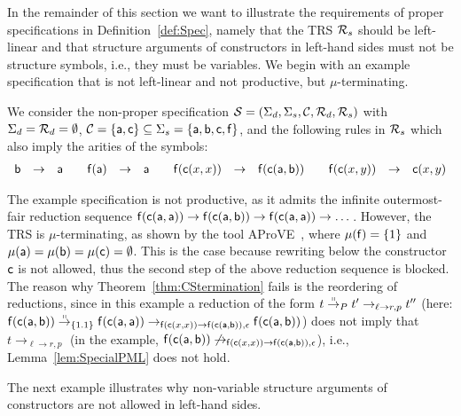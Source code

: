 \documentclass{eptcs}
\begin{document}
In the remainder of this section we want to illustrate the requirements
of proper specifications in Definition~\ref{def:Spec}, namely that the TRS
$\mathcal{R}_s$ should be left-linear and that structure arguments of constructors in
left-hand sides must not be structure symbols, i.e., they must be variables.
We begin with an example specification that is not left-linear and not
productive, but $\mu$-terminating.

\begin{example}
\label{ex:CexpLeftLin}
We consider the non-proper specification
$\mathcal{S} = (\Sigma_d,\Sigma_s,\mathcal{C},\mathcal{R}_d,\mathcal{R}_s)$ with $\Sigma_d = \mathcal{R}_d = \emptyset$,
$\mathcal{C} = \{ \mathsf{a}, \mathsf{c} \} \subseteq \Sigma_s =
\{ \mathsf{a}, \mathsf{b}, \mathsf{c}, \mathsf{f} \}$,
and the following rules in $\mathcal{R}_s$ which also imply the arities of the symbols:
\[
\begin{array}{rcl@{\qquad}rcl@{\qquad}rcl@{\qquad}rcl}
\fsym{b} &\to& \fsym{a}
&
\fsym{f}(\fsym{a}) &\to& \fsym{a}
&
\fsym{f}(\fsym{c}(x,x)) &\to& \fsym{f}(\fsym{c}(\fsym{a},\fsym{b}))
&
\fsym{f}(\fsym{c}(x,y)) &\to& \fsym{c}(x,y)
\end{array}
\]

The example specification is not productive, as it admits the infinite
outermost-fair reduction sequence
$\mathsf{f}(\mathsf{c}(\mathsf{a},\mathsf{a})) \to \mathsf{f}(\mathsf{c}(\mathsf{a},\mathsf{b}))
\to \mathsf{f}(\mathsf{c}(\mathsf{a},\mathsf{a})) \to \dots$.
However, the TRS is $\mu$-terminating, as shown by the tool
AProVE~\cite{AProVE06}, where $\mu(\mathsf{f}) = \{ 1 \}$ and
$\mu(\mathsf{a}) = \mu(\mathsf{b}) = \mu(\mathsf{c}) = \emptyset$. This is the case
because rewriting below the constructor~$\mathsf{c}$ is not allowed, thus the
second step of the above reduction sequence is blocked.
The reason why Theorem~\ref{thm:CStermination} fails is the
reordering of reductions, since in this example a reduction of the form
$t \mathrel{\smash{\overset{\shortparallel}{\rightarrow}}}_P t' \to_{\ell \to r, p} t''$
(here: $
    \mathsf{f}(\mathsf{c}(\mathsf{a},\mathsf{b}))
\mathrel{\smash{\overset{\shortparallel}{\rightarrow}}}_{\{1.1\}}
    \mathsf{f}(\mathsf{c}(\mathsf{a},\mathsf{a}))
\to_{\mathsf{f}(\mathsf{c}(x,x)) \to \mathsf{f}(\mathsf{c}(\mathsf{a},\mathsf{b})),\epsilon}
    \mathsf{f}(\mathsf{c}(\mathsf{a},\mathsf{b}))
$)
does not imply that $t \to_{\ell \to r, p}$
(in the example, $\mathsf{f}(\mathsf{c}(\mathsf{a},\mathsf{b}))
\not\to_{\mathsf{f}(\mathsf{c}(x,x)) \to \mathsf{f}(\mathsf{c}(\mathsf{a},\mathsf{b})),
    \epsilon}$),
i.e., Lemma~\ref{lem:SpecialPML} does not hold.
\end{example}


The next example illustrates why non-variable structure arguments of
constructors are not allowed in left-hand sides.
\end{document}
